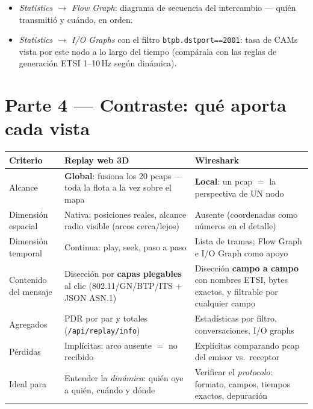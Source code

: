 \documentclass[11pt,a4paper]{article}
\begin{document}
\begin{itemize}[leftmargin=1.6em, itemsep=2pt]
  \item \emph{Statistics $\rightarrow$ Flow Graph}: diagrama de secuencia del
        intercambio --- quién transmitió y cuándo, en orden.
  \item \emph{Statistics $\rightarrow$ I/O Graphs} con el filtro
        \texttt{btpb.dstport==2001}: tasa de CAMs vista por este nodo a lo
        largo del tiempo (compárala con las reglas de generación ETSI
        1--10\,Hz según dinámica).
\end{itemize}

\section{Parte 4 --- Contraste: qué aporta cada vista}

\begin{center}
\small
\begin{tabular}{@{}p{}p{}p{}@{}}
\toprule
\textbf{Criterio} & \textbf{Replay web 3D} & \textbf{Wireshark} \\
\midrule
Alcance & \textbf{Global}: fusiona los 20 pcaps --- toda la flota a la vez sobre el mapa & \textbf{Local}: un pcap $=$ la perspectiva de UN nodo \\
Dimensión espacial & Nativa: posiciones reales, alcance radio visible (arcos cerca/lejos) & Ausente (coordenadas como números en el detalle) \\
Dimensión temporal & Continua: play, seek, paso a paso & Lista de tramas; Flow Graph e I/O Graph como apoyo \\
Contenido del mensaje & Disección por \textbf{capas plegables} al clic (802.11/GN/BTP/ITS + JSON ASN.1) & Disección \textbf{campo a campo} con nombres ETSI, bytes exactos, y filtrable por cualquier campo \\
Agregados & PDR por par y totales (\texttt{/api/replay/info}) & Estadísticas por filtro, conversaciones, I/O graphs \\
Pérdidas & Implícitas: arco ausente $=$ no recibido & Explícitas comparando pcap del emisor vs.\ receptor \\
Ideal para & Entender la \emph{dinámica}: quién oye a quién, cuándo y dónde & Verificar el \emph{protocolo}: formato, campos, tiempos exactos, depuración \\
\bottomrule
\end{tabular}
\end{center}
\end{document}
